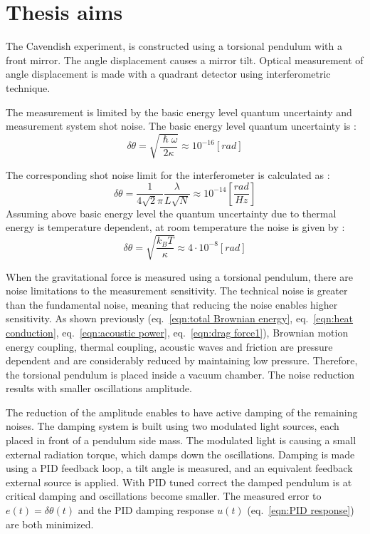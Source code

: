 \documentclass[\main/master.tex]{subfiles}
\begin{document}
\chapter{Thesis aims}\label{chapter:Thesis aims}

The Cavendish experiment, is constructed using a torsional pendulum with a front mirror. The angle displacement causes a mirror tilt. Optical measurement of angle displacement is made with a quadrant detector using interferometric technique.
\par\noindent
The measurement is limited by the basic energy level quantum uncertainty and measurement system shot noise. The basic energy level quantum uncertainty is \cite{howell2019}:
\begin{equation}
\delta\theta= \sqrt{\frac{\hslash\omega}{2\kappa}} \approx 10^{-16} [rad]    \label{eqn:basic uncertainty}
\end{equation}
\par\noindent
The corresponding shot noise limit for the interferometer is calculated as :
\begin{equation}
\delta\theta = \frac{1}{4\sqrt{2}\pi}\frac{\lambda}{L\sqrt{N}} \approx
10^{-14} [\frac{rad}{Hz}]    \label{eqn:shot limit}
\end{equation}
Assuming above basic energy level the quantum uncertainty due to thermal energy is temperature dependent, at room temperature the noise is given by :
\begin{equation}
\delta\theta = \sqrt{\frac{k_B T}{\kappa}} \approx 4\cdot 10^{-8} [rad] \label{eqn:Brownian uncertainty 3}
\end{equation}
\par\noindent
When the gravitational force is measured using a torsional pendulum, there are noise limitations to the measurement sensitivity. The technical noise is greater than the fundamental noise, meaning that reducing the noise enables higher sensitivity. As shown previously (eq.~\ref{eqn:total Brownian energy}, eq.~\ref{eqn:heat conduction}, eq.~\ref{eqn:acoustic power}, eq.~\ref{eqn:drag force1}), Brownian motion energy coupling, thermal coupling, acoustic waves and friction are pressure dependent and are considerably reduced by maintaining low pressure. Therefore, the torsional pendulum is placed inside a vacuum chamber. The noise reduction results with smaller oscillations amplitude.
\par\noindent
The reduction of the amplitude enables to have active damping of the remaining noises. The damping system is built using two modulated light sources, each placed in front of a pendulum side mass. The modulated light is causing a small external radiation torque, which damps down the oscillations. Damping is made using a PID feedback loop, a tilt angle is measured, and an equivalent feedback external source is applied. With PID tuned correct the damped pendulum is at critical damping and oscillations become smaller. The measured error to $e(t) = \delta\theta(t)$ and the PID damping response $u(t)$ (eq.~\ref{eqn:PID response}) are both minimized. 
\end{document}
